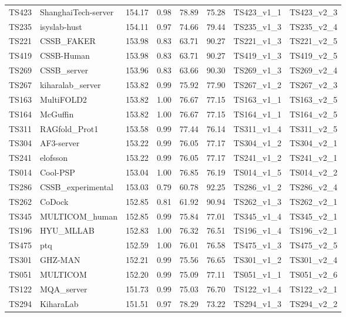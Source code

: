 \begin{longtable}{llllllll}
TS423 & ShanghaiTech-server & 154.17 & 0.98 & 78.89 & 75.28 & TS423\_v1\_1 & TS423\_v2\_3 \\ 
TS235 & isyslab-hust & 154.11 & 0.97 & 74.66 & 79.44 & TS235\_v1\_3 & TS235\_v2\_4 \\ 
TS221 & CSSB\_FAKER & 153.98 & 0.83 & 63.71 & 90.27 & TS221\_v1\_3 & TS221\_v2\_5 \\ 
TS419 & CSSB-Human & 153.98 & 0.83 & 63.71 & 90.27 & TS419\_v1\_3 & TS419\_v2\_5 \\ 
TS269 & CSSB\_server & 153.96 & 0.83 & 63.66 & 90.30 & TS269\_v1\_3 & TS269\_v2\_4 \\ 
TS267 & kiharalab\_server & 153.82 & 0.99 & 75.92 & 77.90 & TS267\_v1\_2 & TS267\_v2\_3 \\ 
TS163 & MultiFOLD2 & 153.82 & 1.00 & 76.67 & 77.15 & TS163\_v1\_1 & TS163\_v2\_5 \\ 
TS164 & McGuffin & 153.82 & 1.00 & 76.67 & 77.15 & TS164\_v1\_1 & TS164\_v2\_5 \\ 
TS311 & RAGfold\_Prot1 & 153.58 & 0.99 & 77.44 & 76.14 & TS311\_v1\_4 & TS311\_v2\_5 \\ 
TS304 & AF3-server & 153.22 & 0.99 & 76.05 & 77.17 & TS304\_v1\_2 & TS304\_v2\_1 \\ 
TS241 & elofsson & 153.22 & 0.99 & 76.05 & 77.17 & TS241\_v1\_2 & TS241\_v2\_1 \\ 
TS014 & Cool-PSP & 153.04 & 1.00 & 76.85 & 76.19 & TS014\_v1\_5 & TS014\_v2\_2 \\ 
TS286 & CSSB\_experimental & 153.03 & 0.79 & 60.78 & 92.25 & TS286\_v1\_2 & TS286\_v2\_4 \\ 
TS262 & CoDock & 152.85 & 0.81 & 61.92 & 90.94 & TS262\_v1\_3 & TS262\_v2\_1 \\ 
TS345 & MULTICOM\_human & 152.85 & 0.99 & 75.84 & 77.01 & TS345\_v1\_4 & TS345\_v2\_1 \\ 
TS196 & HYU\_MLLAB & 152.83 & 1.00 & 76.32 & 76.51 & TS196\_v1\_4 & TS196\_v2\_1 \\ 
TS475 & ptq & 152.59 & 1.00 & 76.01 & 76.58 & TS475\_v1\_3 & TS475\_v2\_5 \\ 
TS301 & GHZ-MAN & 152.21 & 0.99 & 75.56 & 76.65 & TS301\_v1\_2 & TS301\_v2\_4 \\ 
TS051 & MULTICOM & 152.20 & 0.99 & 75.09 & 77.11 & TS051\_v1\_1 & TS051\_v2\_6 \\ 
TS122 & MQA\_server & 151.73 & 0.99 & 75.03 & 76.70 & TS122\_v1\_4 & TS122\_v2\_1 \\ 
TS294 & KiharaLab & 151.51 & 0.97 & 78.29 & 73.22 & TS294\_v1\_3 & TS294\_v2\_2 \\ 

\end{longtable}
